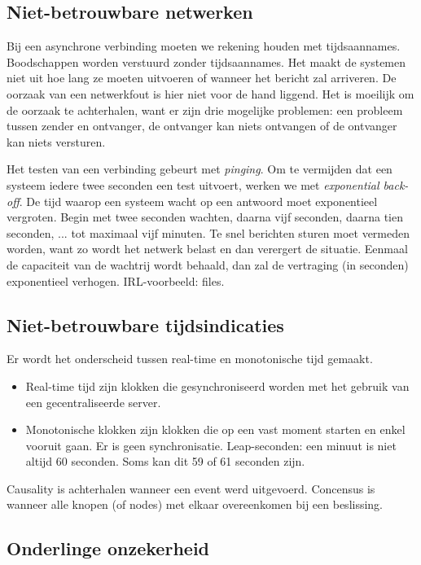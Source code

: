 \documentclass[a4paper,10pt,twoside]{report}
\begin{document}
\subsection{Niet-betrouwbare netwerken}

Bij een asynchrone verbinding moeten we rekening houden met tijdsaannames. Boodschappen worden verstuurd zonder tijdsaannames. Het maakt de systemen niet uit hoe lang ze moeten uitvoeren of wanneer het bericht zal arriveren. De oorzaak van een netwerkfout is hier niet voor de hand liggend. Het is moeilijk om de oorzaak te achterhalen, want er zijn drie mogelijke problemen: een probleem tussen zender en ontvanger, de ontvanger kan niets ontvangen of de ontvanger kan niets versturen.

Het testen van een verbinding gebeurt met \textit{pinging}. Om te vermijden dat een systeem iedere twee seconden een test uitvoert, werken we met \textit{exponential back-off}. De tijd waarop een systeem wacht op een antwoord moet exponentieel vergroten. Begin met twee seconden wachten, daarna vijf seconden, daarna tien seconden, ... tot maximaal vijf minuten. Te snel berichten sturen moet vermeden worden, want zo wordt het netwerk belast en dan verergert de situatie. Eenmaal de capaciteit van de wachtrij wordt behaald, dan zal de vertraging (in seconden) exponentieel verhogen. IRL-voorbeeld: files.

\subsection{Niet-betrouwbare tijdsindicaties}

Er wordt het onderscheid tussen real-time en monotonische tijd gemaakt. 

\begin{itemize}
	\item Real-time tijd zijn klokken die gesynchroniseerd worden met het gebruik van een gecentraliseerde server.
	\item Monotonische klokken zijn klokken die op een vast moment starten en enkel vooruit gaan. Er is geen synchronisatie. Leap-seconden: een minuut is niet altijd 60 seconden. Soms kan dit 59 of 61 seconden zijn.
\end{itemize}

Causality is achterhalen wanneer een event werd uitgevoerd. Concensus is wanneer alle knopen (of nodes) met elkaar overeenkomen bij een beslissing.

\subsection{Onderlinge onzekerheid}
\end{document}
